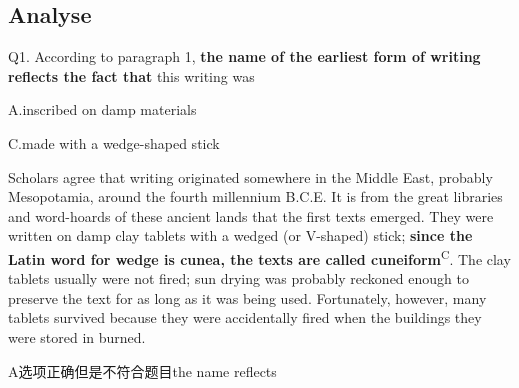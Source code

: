 \newpage

\subsection{Analyse}

\begin{blk}
    \begin{qst}
        Q1. According to paragraph 1, \textbf{the name of the earliest form of writing reflects the fact that} this writing was
    \end{qst}

    \begin{chc}
        A.inscribed on damp materials

        C.made with a wedge-shaped stick
    \end{chc}

    \begin{psgq}
        Scholars agree that writing originated somewhere in the Middle East, probably Mesopotamia, around the fourth millennium B.C.E. It is from the great libraries and word-hoards of these ancient lands that the first texts emerged. They were written on damp clay tablets with a wedged (or V-shaped) stick; \textbf{since the Latin word for wedge is cunea, the texts are called cuneiform}\textsuperscript{C}. The clay tablets usually were not fired; sun drying was probably reckoned enough to preserve the text for as long as it was being used. Fortunately, however, many tablets survived because they were accidentally fired when the buildings they were stored in burned.
    \end{psgq}

    \begin{nlz}
        A选项正确但是不符合题目the name reflects
    \end{nlz}
\end{blk}

